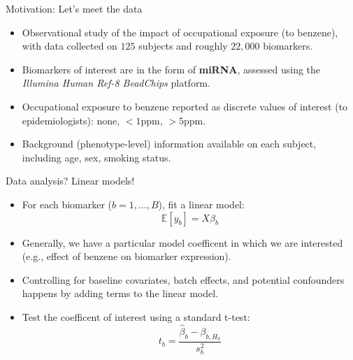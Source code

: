 \documentclass[12pt,t,handout]{beamer}
\begin{document}
\begin{frame}[c]{Motivation: Let's meet the data}
\begin{center}
\begin{itemize}
  \itemsep12pt
  \item Observational study of the impact of occupational exposure (to benzene),
    with data collected on $125$ subjects and roughly $22,000$ biomarkers.
  \item Biomarkers of interest are in the form of \textbf{miRNA}, assessed
    using the \textit{Illumina Human Ref-8 BeadChips} platform.
  \item Occupational exposure to benzene reported as discrete values of
    interest (to epidemiologists): none, $<1$ppm, $>5$ppm.
  \item Background (phenotype-level) information available on each subject,
    including age, sex, smoking status.
\end{itemize}
\end{center}


\end{frame}



\begin{frame}[c]{Data analysis? Linear models!}
\begin{center}
\begin{itemize}
  \itemsep12pt
  \item For each biomarker ($b = 1, \dots, B$), fit a linear model:
    \[
    \mathbb{E}[y_b] = X \beta_b
    \]
  \item Generally, we have a particular model coefficent in which we are
    interested (e.g., effect of benzene on biomarker expression).
  \item Controlling for baseline covariates, batch effects, and potential
    confounders happens by adding terms to the linear model.
  \item Test the coefficent of interest using a standard t-test:
    \[
      t_{b} = \frac{\hat{\beta}_{b} - \beta_{b, H_0}}{s^2_b}
    \]
\end{itemize}
\end{center}


\end{frame}
\end{document}

